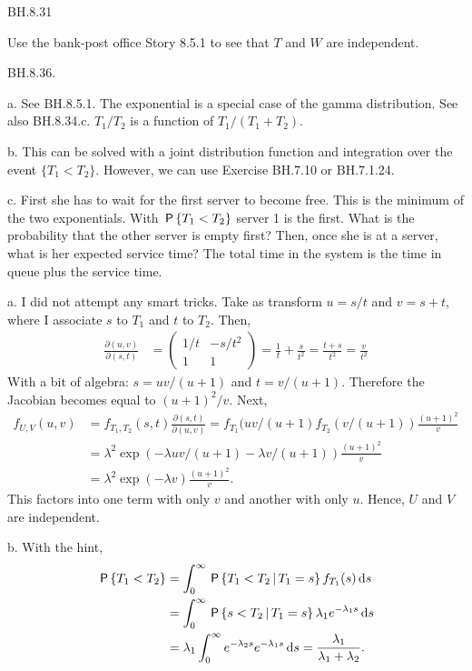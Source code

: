\begin{exercise}
BH.8.31
\begin{hint}
Use the bank-post office Story 8.5.1 to see that $T$ and $W$ are independent.
\end{hint}
\end{exercise}


\begin{exercise}
BH.8.36.
\begin{hint}
a. See BH.8.5.1. The exponential is a special case of the gamma distribution. See also BH.8.34.c. $T_1/T_2$ is a function of $T_1/(T_1+T_2)$.

b. This can be solved with a joint distribution function and integration over the event $\{T_1<T_2\}$. However, we can use Exercise BH.7.10 or BH.7.1.24.

c. First she has to wait for the first server to become free. This is the minimum of the two exponentials.
With $\P{T_1<T_2}$ server 1 is the first.
What is the probability that the other server is empty first? Then, once she is at a server, what is her expected service time? The total time in the system is the time in queue plus the service time.
\end{hint}
\begin{solution}
a. I did not attempt any smart tricks. Take as transform $u=s/t$ and $v=s+t$, where I associate $s$ to $T_{1}$ and $t$  to $T_2$. Then,
\begin{align*}
\frac{\partial (u,v)}{\partial (s,t)} &=
  \begin{pmatrix}
    1/t & -s/t^{2} \\
1 & 1
  \end{pmatrix} = \frac 1 t + \frac{s}{t^{2}} = \frac{t+s}{t^{2}} = \frac{v}{t^{2}}
\end{align*}
With a bit of algebra: $s=uv/(u+1)$ and $t=v/(u+1)$. Therefore the Jacobian becomes equal to $(u+1)^2/v$. Next,
\begin{align*}
  f_{U, V}(u,v) &= f_{T_1,T_2}(s,t) \frac{\partial (s,t)}{\partial (u,v)}
  =  f_{T_1}(uv/(u+1) f_{T_2}(v/(u+1)) \frac{(u+1)^{2}}{v} \\
  &=  \lambda^{2} \exp(-\lambda uv/(u+1) - \lambda v/(u+1)) \frac{(u+1)^{2}}{v} \\
  &=  \lambda^{2} \exp(-\lambda v) \frac{(u+1)^{2}}{v}.
\end{align*}
This factors into one term with only $v$ and another with only $u$. Hence, $U$ and $V$ are independent.


b. With the hint,
\begin{align*}
\P{T_1<T_2}
&= \int_0^{\infty} \P{T_1< T_2\given T_1=s} f_{T_1}(s)\d s \\
&= \int_0^{\infty} \P{s< T_2\given T_1=s} \lambda_1e^{-\lambda_1 s} \d s \\
&= \lambda_{1} \int_0^{\infty} e^{-\lambda_{2} s} e^{-\lambda_1 s} \d s = \frac{\lambda_1}{\lambda_1+\lambda_2}.
\end{align*}


\end{solution}
\end{exercise}
